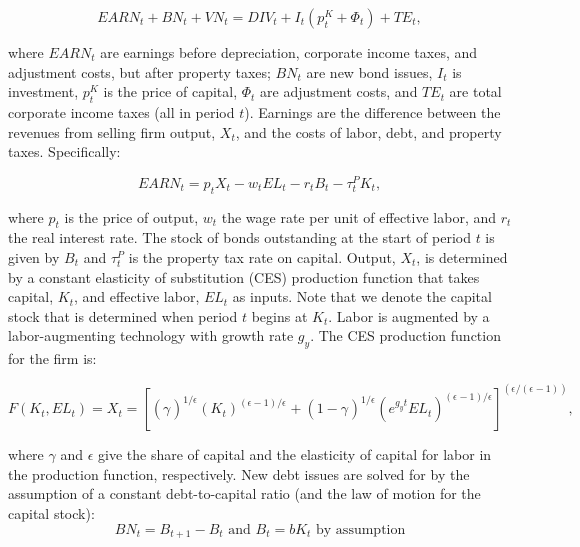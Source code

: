 \begin{equation}
\label{eqn:vn}
EARN_{t}+BN_{t}+VN_{t}=DIV_{t}+I_{t}(p^{K}_{t}+\Phi_{t})+TE_{t}, 
\end{equation}

\noindent\noindent where $EARN_{t}$ are earnings before depreciation, corporate income taxes, and adjustment costs, but after property taxes; $BN_{t}$ are new bond issues, $I_{t}$ is investment, $p^{K}_{t}$ is the price of capital, $\Phi_{t}$ are adjustment costs, and $TE_{t}$ are total corporate income taxes (all in period $t$).  Earnings are the difference between the revenues from selling firm output, $X_{t}$, and the costs of labor, debt, and property taxes.  Specifically:    

\begin{equation}
\label{eqn:earn}
EARN_{t}=p_{t}X_{t}-w_{t}EL_{t}-r_{t}B_{t}-\tau^{P}_{t}K_{t},
\end{equation}

\noindent\noindent where $p_{t}$ is the price of output, $w_{t}$ the wage rate per unit of effective labor, and $r_{t}$ the real interest rate.  The stock of bonds outstanding at the start of period $t$ is given by $B_{t}$ and $\tau^{P}_{t}$ is the property tax rate on capital.  Output, $X_{t}$, is determined by a constant elasticity of substitution (CES) production function that takes capital, $K_{t}$, and effective labor, $EL_{t}$ as inputs. Note that we denote the capital stock that is determined when period $t$ begins at $K_{t}$.  Labor is augmented by a labor-augmenting technology with growth rate $g_{y}$.  The CES production function for the firm is:

\begin{equation}
\label{eqn:prod_fun}
F(K_{t},EL_{t})=X_{t} = \left[(\gamma_{})^{1/\epsilon_{}}(K_{t})^{(\epsilon-1)/\epsilon_{}}+(1-\gamma_{})^{1/\epsilon_{}}(e^{g_{y}t}EL_{t})^{(\epsilon_{}-1)/\epsilon_{}}\right]^{(\epsilon_{}/(\epsilon_{}-1))},
\end{equation}

\noindent\noindent where $\gamma$ and $\epsilon$ give the share of capital and the elasticity of capital for labor in the production function, respectively.  New debt issues are solved for by the assumption of a constant debt-to-capital ratio (and the law of motion for the capital stock):
\begin{equation}
\label{eqn:debt}
BN_{t}=B_{t+1} - B_{t} \text{ and } B_{t}=bK_{t} \text{ by assumption} 
\end{equation}


